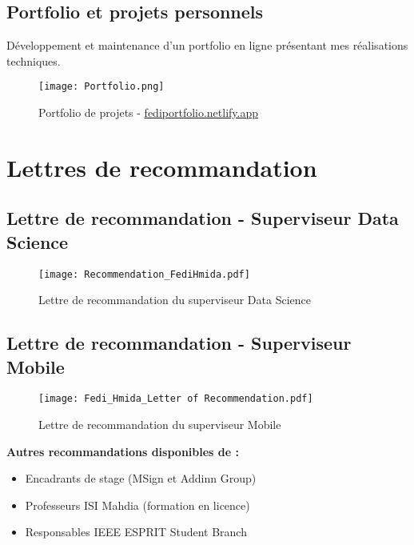\documentclass[12pt,a4paper]{report}
\begin{document}
\subsection{Portfolio et projets personnels}
Développement et maintenance d'un portfolio en ligne présentant mes réalisations techniques.

\begin{figure}[H]
    \centering
    \texttt{[image: Portfolio.png]}
    \caption{Portfolio de projets - \href{https://fediportfolio.netlify.app/}{fediportfolio.netlify.app}}
    \label{fig:portfolio}
\end{figure}

\section{Lettres de recommandation}

\subsection{Lettre de recommandation - Superviseur Data Science}

\begin{figure}[H]
    \centering
    \texttt{[image: Recommendation\_FediHmida.pdf]}
    \caption{Lettre de recommandation du superviseur Data Science}
    \label{fig:recommendation_data}
\end{figure}

\subsection{Lettre de recommandation - Superviseur Mobile}

\begin{figure}[H]
    \centering
    \texttt{[image: Fedi\_Hmida\_Letter of Recommendation.pdf]}
    \caption{Lettre de recommandation du superviseur Mobile}
    \label{fig:recommendation_mobile}
\end{figure}

\textbf{Autres recommandations disponibles de :}
\begin{itemize}
    \item Encadrants de stage (MSign et Addinn Group)
    \item Professeurs ISI Mahdia (formation en licence)
    \item Responsables IEEE ESPRIT Student Branch
\end{itemize}
\end{document}
